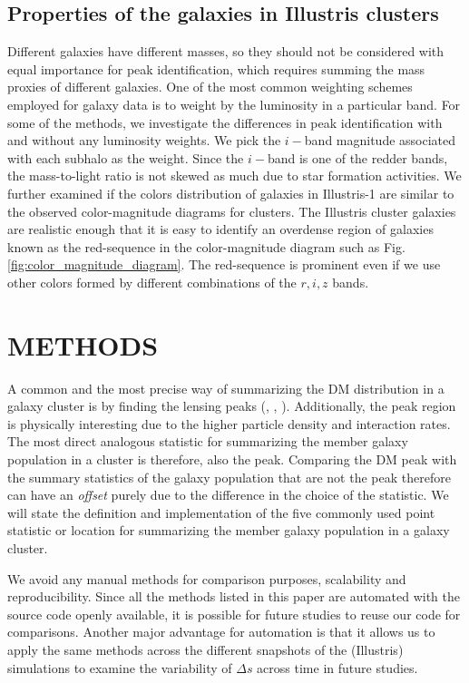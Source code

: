 \subsection{Properties of the galaxies in Illustris clusters}
\label{subsec:galaxy_properties}

Different galaxies have different masses, so they should not be considered with equal
importance for peak identification, which requires summing
the mass proxies of different galaxies. One of the most common weighting schemes employed for galaxy data is to weight
by the luminosity in a particular band. For some of the methods, we investigate
the differences in peak identification with and without any luminosity weights.
We pick the $i-$band magnitude
associated with each subhalo as the weight. Since the $i-$band is
one of the redder bands, the mass-to-light ratio is not skewed as much due to star
formation activities. 
We further examined if the colors distribution of galaxies in Illustris-1 are
similar to the observed color-magnitude diagrams for clusters.
The Illustris cluster galaxies are realistic enough that it is easy to
identify an overdense region of galaxies known as the red-sequence in the 
color-magnitude diagram such as Fig.
\ref{fig:color_magnitude_diagram}. The red-sequence is prominent even if we
use other colors formed by different combinations of the $r, i, z$ bands.

\section{METHODS}\label{sec:methods}
A common and the most precise way of summarizing the DM distribution in a
galaxy cluster is by finding the lensing peaks 
(\citealt{Medezinski2013}, \citealt{Markevitch2004}, \citealt{Zitrin13}).
Additionally, the peak region is physically 
interesting due to the higher particle density and interaction rates. 
The most direct analogous statistic for summarizing the member galaxy
population in a cluster is therefore, also the peak. 
Comparing the DM peak with the summary statistics of the galaxy population that
are not the peak therefore can have an {\it offset} purely due to the difference in
the choice of the statistic. 
We will state the definition and implementation of the five commonly used 
point statistic or location for summarizing 
the member galaxy population in a galaxy cluster.

We avoid any manual methods for
comparison purposes, scalability and reproducibility. 
Since all the methods listed in this
paper are automated with the source code openly available, 
it is possible for future studies to reuse our code for comparisons. 
Another major advantage for automation is that it allows us  
to apply
the same methods across the different snapshots of the (Illustris) simulations to
examine the variability of $\Delta s$ across time in future studies. 


